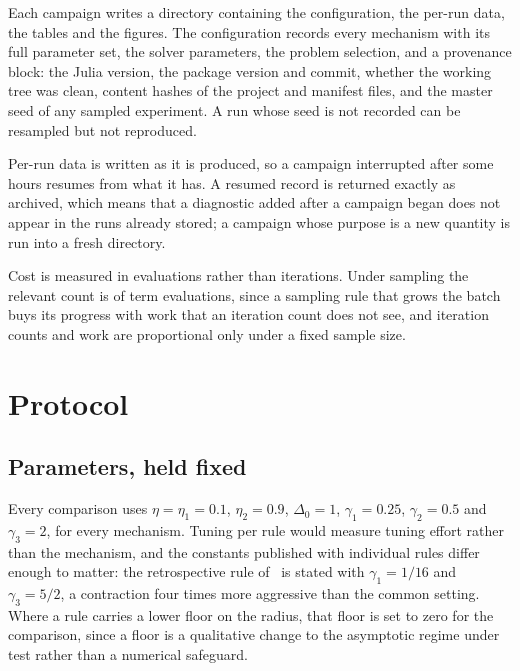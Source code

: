\documentclass[11pt]{article}
\theoremstyle{plain}
\theoremstyle{definition}
\theoremstyle{remark}
\numberwithin{equation}{section}
\begin{document}
Each campaign writes a directory containing the configuration, the per-run data,
the tables and the figures. The configuration records every mechanism with its
full parameter set, the solver parameters, the problem selection, and a
provenance block: the Julia version, the package version and commit, whether the
working tree was clean, content hashes of the project and manifest files, and the
master seed of any sampled experiment. A run whose seed is not recorded can be
resampled but not reproduced.

Per-run data is written as it is produced, so a campaign interrupted after some
hours resumes from what it has. A resumed record is returned exactly as archived,
which means that a diagnostic added after a campaign began does not appear in the
runs already stored; a campaign whose purpose is a new quantity is run into a
fresh directory.

Cost is measured in evaluations rather than iterations. Under sampling the
relevant count is of term evaluations, since a sampling rule that grows the batch
buys its progress with work that an iteration count does not see, and iteration
counts and work are proportional only under a fixed sample size.


\section{Protocol}
\label{sec: protocol}

\subsection{Parameters, held fixed}

Every comparison uses $\eta = \eta_1 = 0.1$, $\eta_2 = 0.9$, $\Delta_0 = 1$,
$\gamma_1 = 0.25$, $\gamma_2 = 0.5$ and $\gamma_3 = 2$, for every mechanism.
Tuning per rule would measure tuning effort rather than the mechanism, and the
constants published with individual rules differ enough to matter: the
retrospective rule of~\citet{BastMalmMoufToinToma10} is stated with
$\gamma_1 = 1/16$ and $\gamma_3 = 5/2$, a contraction four times more aggressive
than the common setting. Where a rule carries a lower floor on the radius, that
floor is set to zero for the comparison, since a floor is a qualitative change to
the asymptotic regime under test rather than a numerical safeguard.
\end{document}
